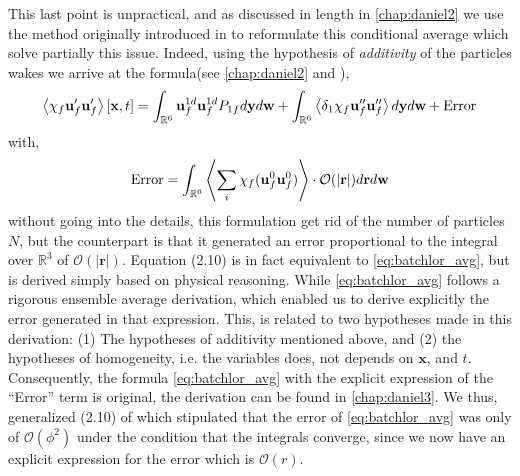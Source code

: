 This last point is unpractical, and as discussed in length in \ref{chap:daniel2} we use the method originally introduced in \citet{batchelor1972sedimentation} to reformulate this conditional average which solve partially this issue. 
Indeed, using the hypothesis of \textit{additivity} of the particles wakes we arrive at the formula(see \ref{chap:daniel2} and \citet{batchelor1972sedimentation}), 
\begin{align}
    \avg{\chi_f \textbf{u}_f' \textbf{u}_f'}[\textbf{x},t] =
    \int_{\mathbb{R}^6}
    \textbf{u}_f^{1d}
    \textbf{u}_f^{1d}
    P_{1f}
    d\textbf{y}
    d\textbf{w}
    + 
    \int_{\mathbb{R}^6}
    \avg{\delta_1 \chi_f\textbf{u}_f'' \textbf{u}_f''}
    d\textbf{y}
    d\textbf{w}
    +
    \text{Error}
    \label{eq:batchlor_avg}
\end{align}
with, 
\begin{equation}
    \text{Error}
    = 
    \int_{\mathbb{R}^6}
    \avg{\sum_i
    \chi_f (\textbf{u}_f^0\textbf{u}_f^0)
    }\cdot\mathcal{O}(|\textbf{r}|)
    d\textbf{r}
    d\textbf{w}
    \label{eq:error}
\end{equation}
without going into the details, this formulation get rid of the number of particles $N$, but the counterpart is that it generated an error proportional to the integral over $\mathbb{R}^3$ of $\mathcal{O}(|\textbf{r}|)$.
Equation (2.10) \citet{batchelor1972sedimentation} is in fact equivalent to \ref{eq:batchlor_avg}, but is derived simply based on physical reasoning.
While \ref{eq:batchlor_avg} follows a rigorous ensemble average derivation, which enabled us to derive explicitly the error generated in that expression. 
This, is related to two hypotheses made in this derivation: (1) The hypotheses of additivity mentioned above, and (2) the hypotheses of homogeneity, i.e. the variables does, not depends on $\textbf{x}$, and $t$. 
Consequently, the formula \ref{eq:batchlor_avg} with the explicit expression of the ``Error'' term is original, the derivation can be found in \ref{chap:daniel3}. 
We thus, generalized (2.10) of \citet{batchelor1972sedimentation} which stipulated that the error of \ref{eq:batchlor_avg} was only of $\mathcal{O}(\phi^2)$ under the condition that the integrals converge, since we now have an explicit expression for the error which is $\mathcal{O}(r)$. 


